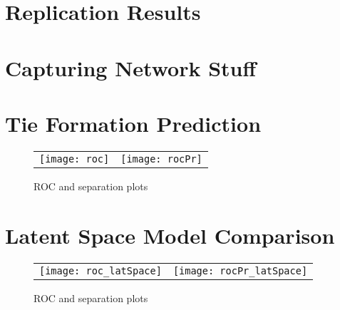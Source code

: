 

\section{Replication Results}



\section{Capturing Network Stuff}



\section{Tie Formation Prediction}



\begin{figure}[ht]
	\centering
	\begin{tabular}{cc}
	\texttt{[image: roc]} & 
	\texttt{[image: rocPr]}	
	\end{tabular}
	\caption{ROC and separation plots}
	\label{fig:roc}
\end{figure}


\section{Latent Space Model Comparison}



\begin{figure}[ht]
	\centering
	\begin{tabular}{cc}
	\texttt{[image: roc\_latSpace]} & 
	\texttt{[image: rocPr\_latSpace]}
	\end{tabular}
	\caption{ROC and separation plots}
	\label{fig:roc_latentSpace}
\end{figure}

